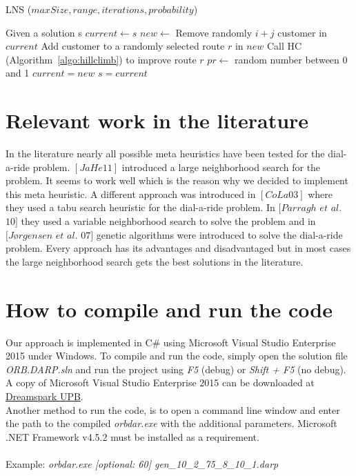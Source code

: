 \documentclass[fleqn]{scrartcl}
\begin{document}
\begin{algorithm}
\caption{LNS ($maxSize, range, iterations, probability$)}
\label{algo:lns}
\begin{algorithmic}[1]
\State Given a solution s
\State $current \gets s$
\State $new \gets$ Remove randomly $i+j$ customer in $current$
\State Add customer to a randomly selected route $r$ in $new$
\State Call HC (Algorithm~\ref{algo:hillclimb}) to improve route $r$
\EndFor
\State $pr \gets$ random number between 0 and 1
\State $current = new$
\State $s = current$
\EndIf
\EndIf
\EndIf
\EndFor
\EndFor
\EndFor
\end{algorithmic}
\end{algorithm}

\newpage
\section{Relevant work in the literature}
In the literature nearly all possible meta heuristics have been tested for the dial-a-ride problem. 
$[JaHe 11]$ introduced a large neighborhood search for the problem. It seems to work well which is the reason why we decided to implement this meta heuristic. A different approach was introduced in $[CoLa 03]$ where they used a tabu search heuristic for the dial-a-ride problem. In $[Parragh$  $et$  $al.$ $10]$ they used a variable neighborhood search to solve the problem and in $[Jørgensen$ $et$ $al.$ $07]$ genetic algorithms were introduced to solve the dial-a-ride problem.
Every approach has its advantages and disadvantaged but in most cases the large neighborhood search gets the best solutions in the literature.

\section{How to compile and run the code}
Our approach is implemented in C\# using Microsoft Visual Studio Enterprise 2015 under Windows. To compile and run the code, simply open the solution file \textit{ORB.DARP.sln} and run the project using \textit{F5} (debug) or \textit{Shift + F5} (no debug). A copy of Microsoft Visual Studio Enterprise 2015 can be downloaded at \href{https://dreamspark.uni-paderborn.de/}{Dreamspark UPB}.
\\
Another method to run the code, is to open a command line window and enter the path to the compiled \textit{orbdar.exe} with the additional parameters. Microsoft .NET Framework v4.5.2 must be installed as a requirement.
\\\\
Example: \textit{orbdar.exe [optional: 60]  gen\_10\_2\_75\_8\_10\_1.darp}
\end{document}
